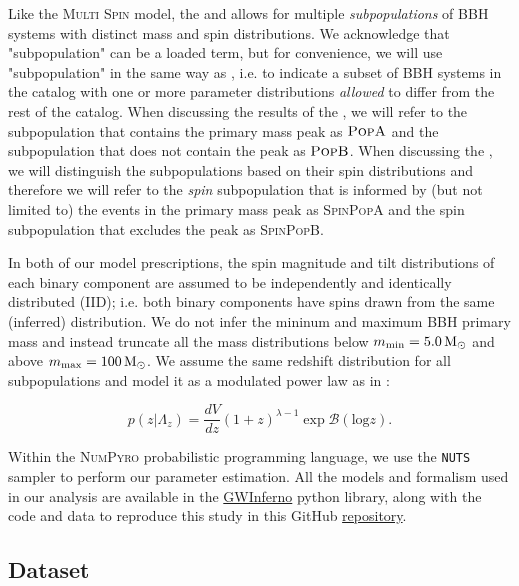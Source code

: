 Like the \textsc{Multi Spin} model, the \base{} and \comp{} allows for multiple \textit{subpopulations} of BBH systems with distinct mass and spin distributions. We acknowledge that "subpopulation" can be a loaded term, but for convenience, we will use "subpopulation" in the same way as \citet{2021ApJ...913L...7A}, i.e. to indicate a subset of BBH systems in the catalog with one or more parameter distributions \textit{allowed} to differ from the rest of the catalog. When discussing the results of the \base{}, we will refer to the subpopulation that contains the primary mass peak as $\textsc{PopA}$ and the subpopulation that does not contain the peak as $\textsc{PopB}$. When discussing the \comp{}, we will distinguish the subpopulations based on their spin distributions and therefore we will refer to the \textit{spin} subpopulation that is informed by (but not limited to) the events in the primary mass peak as \textsc{SpinPopA} and the spin subpopulation that excludes the peak as \textsc{SpinPopB}. 

In both of our model prescriptions, the spin magnitude and tilt distributions of each binary component are assumed to be independently and identically distributed (IID); i.e. both binary components have spins drawn from the same (inferred) distribution. We do not infer the mininum and maximum BBH primary mass and instead truncate all the mass distributions below $m_\text{min} = 5.0{\,\rm M}_\odot$ and above $m_\text{max} = 100{\,\rm M}_\odot$. We assume the same redshift distribution for all subpopulations and model it as a modulated power law as in \brucepaper{}:

\begin{equation}
    p(z|\Lambda_z) = \frac{dV}{dz} (1+z)^{\lambda - 1} \exp \mathcal{B}(\text{log}z).
\end{equation} 

Within the \textsc{NumPyro} \citep{1810.09538,1912.11554} probabilistic programming language, we use the \texttt{NUTS} \citep{1111.4246} sampler to perform our parameter estimation. All the models and formalism used in our analysis are available in the \href{https://github.com/FarrOutLab/GWInferno}{GWInferno} python library, along with the code and data to reproduce this study in this GitHub \href{https://github.com/jaxeng/CosmicCousins}{repository}. 



\subsection{Dataset} \label{sec:dataset} 

